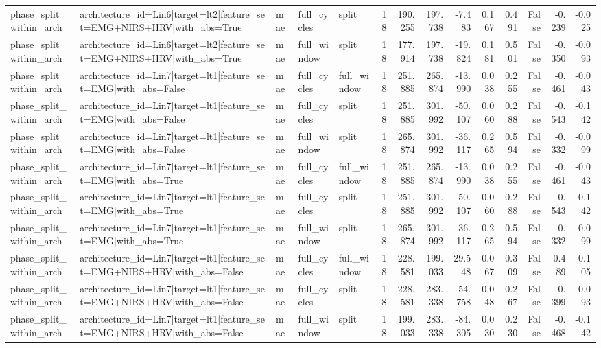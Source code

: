 \begin{table}
\begin{tabular}{lllllrrrrrrrrr}
phase_split_within_arch & architecture_id=Lin6|target=lt2|feature_set=EMG+NIRS+HRV|with_abs=True & mae & full_cycles & split & 18 & 190.255 & 197.738 & -7.483 & 0.167 & 0.491 & False & -0.239 & -0.025 \\
phase_split_within_arch & architecture_id=Lin6|target=lt2|feature_set=EMG+NIRS+HRV|with_abs=True & mae & full_window & split & 18 & 177.914 & 197.738 & -19.824 & 0.181 & 0.501 & False & -0.350 & -0.093 \\
phase_split_within_arch & architecture_id=Lin7|target=lt1|feature_set=EMG|with_abs=False & mae & full_cycles & full_window & 18 & 251.885 & 265.874 & -13.990 & 0.038 & 0.255 & False & -0.461 & -0.043 \\
phase_split_within_arch & architecture_id=Lin7|target=lt1|feature_set=EMG|with_abs=False & mae & full_cycles & split & 18 & 251.885 & 301.992 & -50.107 & 0.060 & 0.288 & False & -0.543 & -0.142 \\
phase_split_within_arch & architecture_id=Lin7|target=lt1|feature_set=EMG|with_abs=False & mae & full_window & split & 18 & 265.874 & 301.992 & -36.117 & 0.265 & 0.594 & False & -0.332 & -0.099 \\
phase_split_within_arch & architecture_id=Lin7|target=lt1|feature_set=EMG|with_abs=True & mae & full_cycles & full_window & 18 & 251.885 & 265.874 & -13.990 & 0.038 & 0.255 & False & -0.461 & -0.043 \\
phase_split_within_arch & architecture_id=Lin7|target=lt1|feature_set=EMG|with_abs=True & mae & full_cycles & split & 18 & 251.885 & 301.992 & -50.107 & 0.060 & 0.288 & False & -0.543 & -0.142 \\
phase_split_within_arch & architecture_id=Lin7|target=lt1|feature_set=EMG|with_abs=True & mae & full_window & split & 18 & 265.874 & 301.992 & -36.117 & 0.265 & 0.594 & False & -0.332 & -0.099 \\
phase_split_within_arch & architecture_id=Lin7|target=lt1|feature_set=EMG+NIRS+HRV|with_abs=False & mae & full_cycles & full_window & 18 & 228.581 & 199.033 & 29.548 & 0.067 & 0.309 & False & 0.489 & 0.105 \\
phase_split_within_arch & architecture_id=Lin7|target=lt1|feature_set=EMG+NIRS+HRV|with_abs=False & mae & full_cycles & split & 18 & 228.581 & 283.338 & -54.758 & 0.048 & 0.267 & False & -0.399 & -0.093 \\
phase_split_within_arch & architecture_id=Lin7|target=lt1|feature_set=EMG+NIRS+HRV|with_abs=False & mae & full_window & split & 18 & 199.033 & 283.338 & -84.305 & 0.030 & 0.230 & False & -0.468 & -0.142 \\

\end{tabular}
\end{table}
